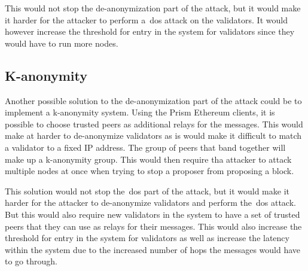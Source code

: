 This would not stop the de-anonymization part of the attack, but it would make it harder for the attacker to perform a~\gls{dos} attack on the validators.
It would however increase the threshold for entry in the system for validators since they would have to run more nodes.

\subsection{K-anonymity}\label{subsec:k-anonymity}
Another possible solution to the de-anonymization part of the attack could be to implement a k-anonymity system.
Using the Prism Ethereum clients, it is possible to choose trusted peers as additional relays for the messages.
This would make at harder to de-anonymize validators as is would make it difficult to match a validator to a fixed IP address.
The group of peers that band together will make up a k-anonymity group.
This would then require tha attacker to attack multiple nodes at once when trying to stop a proposer from proposing a block.

This solution would not stop the~\gls{dos} part of the attack, but it would make it harder for the attacker to de-anonymize validators and perform the~\gls{dos} attack.
But this would also require new validators in the system to have a set of trusted peers that they can use as relays for their messages.
This would also increase the threshold for entry in the system for validators as well as increase the latency within the system due to the increased number of hops the messages would have to go through.